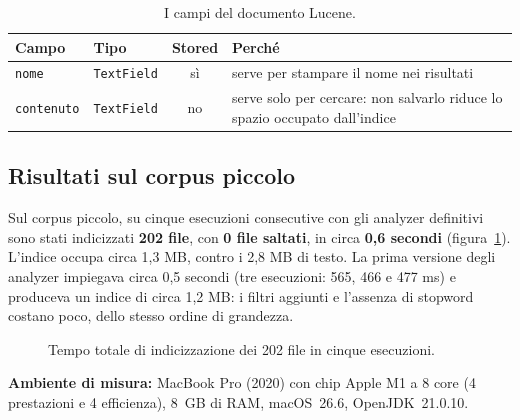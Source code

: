 \documentclass[11pt,a4paper]{article}
\newcommand{\code}[1]{\texttt{#1}}
\newcommand{\field}[1]{\texttt{#1}}
\begin{document}
\begin{table}[!htbp]
\centering
\begin{tabularx}{\linewidth}{@{}llcX@{}}
\toprule
\textbf{Campo} & \textbf{Tipo} & \textbf{Stored} & \textbf{Perché} \\
\midrule
\field{nome} & \code{TextField} & sì & serve per stampare il nome nei risultati \\
\field{contenuto} & \code{TextField} & no & serve solo per cercare: non salvarlo
  riduce lo spazio occupato dall'indice \\
\bottomrule
\end{tabularx}
\caption{I campi del documento Lucene.}
\label{tab:campi}
\end{table}

\subsection{Risultati sul corpus piccolo}

Sul corpus piccolo, su cinque esecuzioni consecutive con gli analyzer definitivi sono stati indicizzati
\textbf{202 file}, con \textbf{0 file saltati}, in circa \textbf{0,6 secondi}
(figura~\ref{fig:tempi}). L'indice occupa circa 1,3 MB, contro i 2,8 MB di testo.
La prima versione degli analyzer impiegava circa 0,5 secondi (tre esecuzioni:
565, 466 e 477 ms) e produceva un indice di circa 1,2 MB: i filtri aggiunti e
l'assenza di stopword costano poco, dello stesso ordine di grandezza.

\begin{figure}[!htbp]
\centering
{}
\caption{Tempo totale di indicizzazione dei 202 file in cinque esecuzioni.}
\label{fig:tempi}
\end{figure}

\noindent\textbf{Ambiente di misura:} MacBook Pro (2020) con chip
Apple M1 a 8 core (4 prestazioni e 4 efficienza), 8~GB di RAM, macOS~26.6,
OpenJDK~21.0.10.
\end{document}
